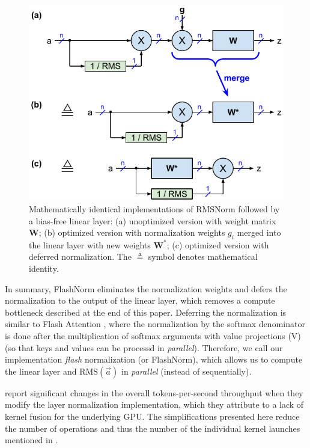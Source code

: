 \documentclass{article}
\numberwithin{equation}{section} %
\newcommand{\mat}[1]{\mathbf{#1}}     %
\def\rms{\text{RMS}(\vec{a})}         %
\def\W*{\mat{W}^\ast}                 %
\begin{document}
\begin{figure}[h!] \centering  %
  \includegraphics[scale=0.9]{figs/flash_fig1.pdf}
  \caption{Mathematically identical implementations of RMSNorm followed by a bias-free linear layer: (a) unoptimized version with weight matrix $\mat{W}$; (b) optimized version with normalization weights $g_i$ merged into the linear layer with new weights $\W*$; (c) optimized version with deferred normalization. The $\triangleq$ symbol denotes mathematical identity.}
\label{fig1} \end{figure}

In summary, FlashNorm eliminates the normalization weights and defers the normalization to the output of the linear layer, which removes a compute bottleneck described at the end of this paper. Deferring the normalization is similar to Flash Attention \citep{flash-attention}, where the normalization by the softmax denominator is done after the multiplication of softmax arguments with value projections (V) (so that keys and values can be processd in \emph{parallel}). Therefore, we call our implementation \emph{flash} normalization (or FlashNorm), which allows us to compute the linear layer and $\rms$ in \emph{parallel} (instead of sequentially).

\citeauthor{openelm} report significant changes in the overall tokens-per-second throughput when they modify the layer normalization implementation, which they attribute to a lack of kernel fusion for the underlying GPU. The simplifications presented here reduce the number of operations and thus the number of the individual kernel launches mentioned in \citep{openelm}.
\end{document}
